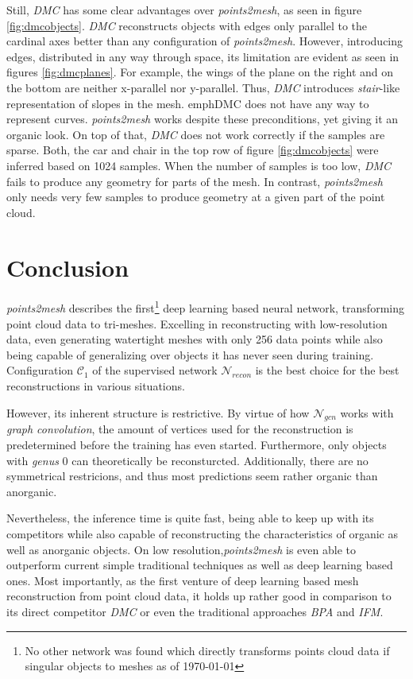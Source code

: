   Still, \emph{DMC} has some clear advantages over \emph{points2mesh}, as seen in figure \ref{fig:dmcobjects}. \emph{DMC} reconstructs objects with edges only 
  parallel to the cardinal axes better than any configuration of \emph{points2mesh}. However, introducing edges, distributed in any way through space,
  its limitation are evident as seen in figures \ref{fig:dmcplanes}. For example, the wings of the plane on the right and on the bottom are neither x-parallel nor y-parallel.
  Thus, \emph{DMC} introduces \emph{stair}-like representation of slopes in the mesh. emph{DMC} does not have any way to represent curves. \emph{points2mesh}
  works despite these preconditions, yet giving it an organic look.
  On top of that, \emph{DMC} does not work correctly if the samples are sparse. Both, the car and chair in the top row of figure \ref{fig:dmcobjects} were inferred based on 1024 samples.
  When the number of samples is too low, \emph{DMC} fails to produce any geometry for parts of the mesh.
  In contrast, \emph{points2mesh} only needs very few samples to produce geometry at a given part of the point cloud.

\section{Conclusion}
\label{conclusion}
  \emph{points2mesh} describes the first\footnote{No other network was found which directly transforms points cloud data if singular objects to meshes as of \today} deep
  learning based neural network, transforming point cloud data to tri-meshes. Excelling in reconstructing with low-resolution data,
  even generating watertight meshes with only 256 data points while also being capable of generalizing over objects it has never seen 
  during training. Configuration $\mathcal{C}_1$ of the supervised network $\mathcal{N}_{recon}$ is the best choice for the best reconstructions
  in various situations.

  However, its inherent structure is restrictive. By virtue of how $\mathcal{N}_{gcn}$ works with \emph{graph convolution}, the amount
  of vertices used for the reconstruction is predetermined before the training has even started. Furthermore, only objects with \emph{genus} 0 
  can theoretically be reconsturcted. Additionally, there are no symmetrical restricions, and thus most predictions seem rather organic than anorganic.

  Nevertheless, the inference time is quite fast, being able to keep up with its competitors while also capable of reconstructing
  the characteristics of organic as well as anorganic objects. On low resolution,\emph{points2mesh} is even able to outperform current
  simple traditional techniques as well as deep learning based ones. Most importantly, as the first venture of deep learning based mesh reconstruction 
  from point cloud data, it holds up rather good in comparison to its direct competitor \emph{DMC} or even the traditional approaches \emph{BPA} and \emph{IFM}.



